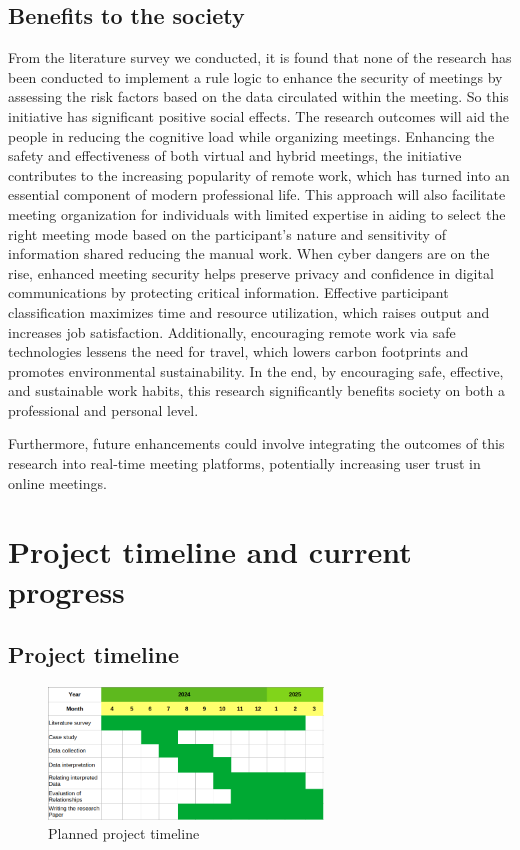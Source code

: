 \begin{spacing}{1.0}
    \subsection{Benefits to the society}
    \indent \par From the literature survey we conducted, it is found that none of the research has been conducted to implement a rule logic to enhance the security of meetings by assessing the risk factors based on the data circulated within the meeting. So this initiative has significant positive social effects. The research outcomes will aid the people in reducing the cognitive load while organizing meetings. Enhancing the safety and effectiveness of both virtual and hybrid meetings, the initiative contributes to the increasing popularity of remote work, which has turned into an essential component of modern professional life. This approach will also facilitate meeting organization for individuals with limited expertise in aiding to select the right meeting mode based on the participant’s nature and sensitivity of information shared reducing the manual work. When cyber dangers are on the rise, enhanced meeting security helps preserve privacy and confidence in digital communications by protecting critical information. Effective participant classification maximizes time and resource utilization, which raises output and increases job satisfaction. Additionally, encouraging remote work via safe technologies lessens the need for travel, which lowers carbon footprints and promotes environmental sustainability. In the end, by encouraging safe, effective, and sustainable work habits, this research significantly benefits society on both a professional and personal level.
    \par Furthermore, future enhancements could involve integrating the outcomes of this research into real-time meeting platforms, potentially increasing user trust in online meetings.

    \section{Project timeline and current progress}

    \subsection{Project timeline}
    \begin{figure}[h!]
        \centering
        \vspace*{0cm}\includegraphics[width=0.65\textwidth]{timeline.png}
        \caption{Planned project timeline}
    \end{figure}


\end{spacing}
